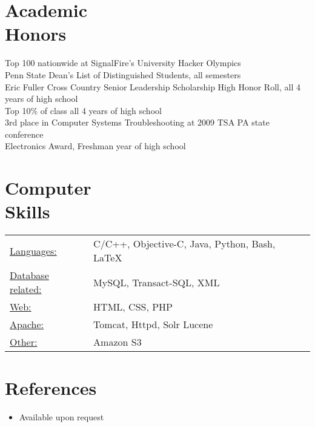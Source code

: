 \documentclass[margin]{res}
\begin{document}
\begin{resume}
\section{Academic \\ Honors} 
Top 100 nationwide at SignalFire's University Hacker Olympics \\
Penn State Dean's List of Distinguished Students, all semesters \\
Eric Fuller Cross Country Senior Leadership Scholarship
High Honor Roll, all 4 years of high school \\
Top 10\% of class all 4 years of high school \\
3rd place in Computer Systems Troubleshooting at 2009 TSA PA state conference \\
Electronics Award, Freshman year of high school \\

\section{Computer \\ Skills}
\begin{tabular}{l p{3in}}
\underline{Languages:} & C/C++, Objective-C, Java, Python, Bash, LaTeX \\
\underline{Database related:} & MySQL, Transact-SQL, XML \\
\underline{Web:} & HTML, CSS, PHP \\
\underline{Apache:} & Tomcat, Httpd, Solr Lucene \\
\underline{Other:} & Amazon S3
\end{tabular}

\section{References}
\begin{itemize} \itemsep -2pt
\item Available upon request
\end{itemize}
\end{resume}
\end{document}

